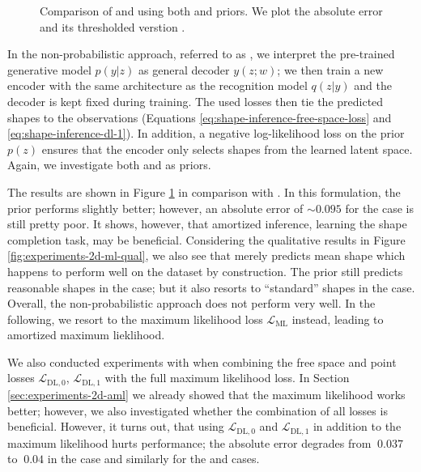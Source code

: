 \begin{figure}
  \caption{Comparison of \ML and \DL using both \PPCA and \VAE priors.
  We plot the absolute error \Abs and its thresholded verstion \AbsThr.}
  \label{fig:experiments-2d-ml}
\end{figure}

In the non-probabilistic approach,
referred to as \DL, we interpret the pre-trained generative model $p(y|z)$
as general decoder $y(z;w)$; we then train a new encoder with the same architecture
as the recognition model $q(z|y)$ and the decoder is kept
fixed during training. The used losses
then tie the predicted shapes to the observations
(\cf Equations \eqref{eq:shape-inference-free-space-loss} and \eqref{eq:shape-inference-dl-1}).
In addition, a negative log-likelihood
loss on the prior $p(z)$ ensures that the encoder only selects shapes from
the learned latent space. Again, we investigate both \PPCA and \VAEs as priors.

The results are shown in Figure \ref{fig:experiments-2d-ml} in comparison
with \ML. In this formulation,
the \VAE prior performs slightly better; however, an absolute error \Abs
of $\sim 0.095$ for the \easy case is still pretty poor. It shows, however, that
amortized inference, \ie learning the shape completion task, may be beneficial.
Considering the qualitative results in Figure \ref{fig:experiments-2d-ml-qual},
we also see that \PPCA merely predicts mean shape which happens to perform
well on the \Rect dataset by construction. The \VAE prior still predicts
reasonable shapes in the \easy case; but it also resorts to ``standard''
shapes in the \hard case. Overall, the non-probabilistic approach does not perform
very well. In the following, we resort to the maximum likelihood loss
$\mathcal{L}_{\text{ML}}$ instead, leading to amortized maximum lieklihood.

We also conducted experiments with \DL when combining the free space and point
losses $\mathcal{L}_{\text{DL},0}$, $\mathcal{L}_{\text{DL},1}$ with the full
maximum likelihood loss.
In Section \ref{sec:experiments-2d-aml} we already showed that
the maximum likelihood works better; however, we also investigated whether
the combination of all losses is beneficial. However, it turns out,
that using $\mathcal{L}_{\text{DL},0}$ and $\mathcal{L}_{\text{DL},1}$
in addition to the maximum likelihood hurts performance; the absolute error
\Abs degrades from $~0.037$ to $~0.04$ in the \easy case and similarly for
the \moderate and \hard cases.

